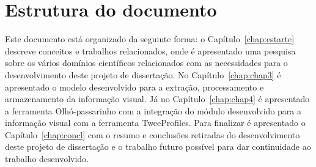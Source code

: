 \section{Estrutura do documento} \label{sec:struct}

Este documento está organizado da seguinte forma: o Capítulo~\ref{chap:estarte} descreve conceitos e trabalhos relacionados, onde é apresentado uma pesquisa sobre os vários domínios científicos relacionados com as necessidades para o desenvolvimento deste projeto de dissertação. No Capítulo~\ref{chap:chap3} é apresentado o modelo desenvolvido para a extração, processamento e armazenamento da informação visual. Já no Capítulo~\ref{chap:chap4} é apresentado a ferramenta Olhó-passarinho com a integração do módulo desenvolvido para a informação visual com a ferramenta TweeProfiles. Para finalizar é apresentado o Capítulo~\ref{chap:concl} com o resumo e conclusões retiradas do desenvolvimento deste projeto de dissertação e o trabalho futuro possível para dar continuidade ao trabalho desenvolvido.

